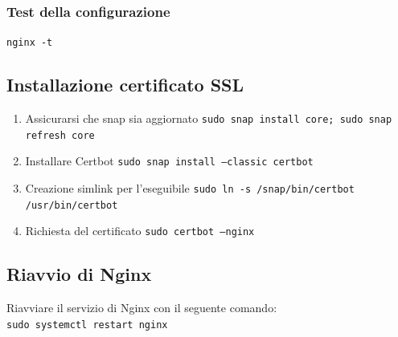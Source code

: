\subsubsection*{Test della configurazione}
\texttt{nginx -t}

\subsection{Installazione certificato SSL}
\begin{enumerate}
\item Assicurarsi che snap sia aggiornato \texttt{sudo snap install core; sudo snap refresh core}
\item Installare Certbot \texttt{sudo snap install --classic certbot}
\item Creazione simlink per l'eseguibile \texttt{sudo ln -s /snap/bin/certbot /usr/bin/certbot}
\item Richiesta del certificato \texttt{sudo certbot --nginx}
\end{enumerate}

\subsection*{Riavvio di Nginx}
Riavviare il servizio di Nginx con il seguente comando: \\
\texttt{sudo systemctl restart nginx}

